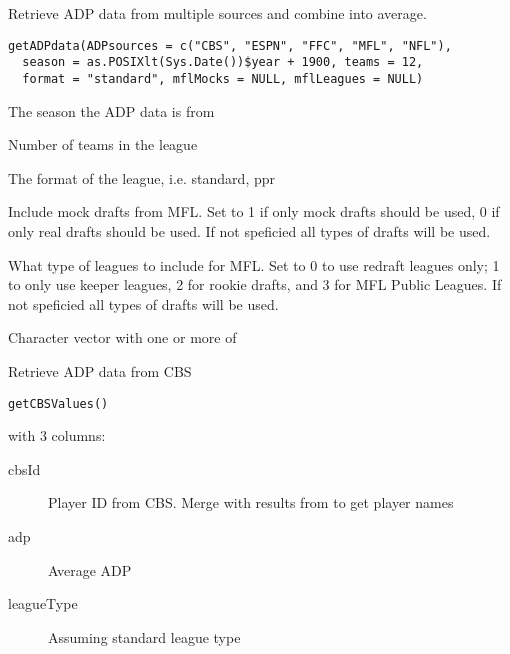 \documentclass[a4paper]{book}
\begin{document}
%
\begin{Description}\relax
Retrieve ADP data from multiple sources and combine into average.
\end{Description}
%
\begin{Usage}
\begin{verbatim}
getADPdata(ADPsources = c("CBS", "ESPN", "FFC", "MFL", "NFL"),
  season = as.POSIXlt(Sys.Date())$year + 1900, teams = 12,
  format = "standard", mflMocks = NULL, mflLeagues = NULL)
\end{verbatim}
\end{Usage}
%
\begin{Arguments}
\begin{ldescription}
\item[\code{season}] The season the ADP data is from

\item[\code{teams}] Number of teams in the league

\item[\code{format}] The format of the league, i.e. standard, ppr

\item[\code{mflMocks}] Include mock drafts from MFL. Set to 1 if only mock drafts
should be used, 0 if only real drafts should be used. If not speficied all
types of drafts will be used.

\item[\code{mflLeagues}] What type of leagues to include for MFL. Set to 0 to use
redraft leagues only; 1 to only use keeper leagues, 2 for rookie drafts, and
3 for MFL Public Leagues. If not speficied all types of drafts will be used.

\item[\code{ADPsource}] Character vector with one or more of
\end{ldescription}
\end{Arguments}
%
\begin{Description}\relax
Retrieve ADP data from CBS
\end{Description}
%
\begin{Usage}
\begin{verbatim}
getCBSValues()
\end{verbatim}
\end{Usage}
%
\begin{Value}
 with 3 columns:
\begin{description}

\item[cbsId] Player ID from CBS. Merge with results from 
to get player names
\item[adp] Average ADP
\item[leagueType] Assuming standard league type
\end{description}

\end{Value}
\end{document}
